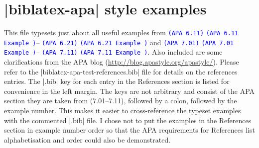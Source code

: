 \documentclass[paper=a4]{article}
\newcommand\apa[2][]{\ifthenelse{\equal{#1}{}}%
                       {\textcolor{blue}{\texttt{(APA #2)}}}%
                       {\textcolor{blue}{\texttt{(APA #2 Example #1)}}}}
\begin{document}
\section*{|biblatex-apa| style examples}
This file typesets just about all useful examples from
\apa{6.11}--\apa{6.21} and \apa{7.01}--\apa{7.11}. Also included are some
clarifications from the APA blog
(\url{http://blog.apastyle.org/apastyle/}). Please refer to the
|biblatex-apa-test-references.bib| file for details on the references
entries. The |.bib| key for each entry in the References section is listed
for convenience in the left margin. The keys are not arbitrary and consist
of the APA section they are taken from (7.01--7.11), followed by a colon,
followed by the example number. This makes it easier to cross-reference the
typeset examples with the commented |.bib| file. I chose not to put the
examples in the References section in example number order so that the APA
requirements for References list alphabetisation and order could also be
demonstrated.
\end{document}
